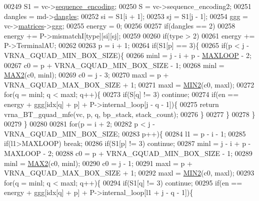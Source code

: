 \begin{DoxyCode}
00249   S1          = vc->\hyperlink{group__fold__compound_a9934bdb695d35a3544285cbcc19f9763}{sequence\_encoding};
00250   S           = vc->sequence\_encoding2;
00251   dangles     = md->\hyperlink{group__model__details_adcda4ff2ea77748ae0e8700288282efc}{dangles};
00252   si          = S1[i + 1];
00253   sj          = S1[j - 1];
00254   ggg         = vc->\hyperlink{group__fold__compound_aca8be7bdc65bafe2172c6ee777f18568}{matrices}->\hyperlink{group__dp__matrices_a0b7b86a5c75c96eabb89eb53a13e7164}{ggg};
00255   energy      = 0;
00256 
00257   \textcolor{keywordflow}{if}(dangles == 2)
00258     energy += P->mismatchI[type][si][sj];
00259 
00260   \textcolor{keywordflow}{if}(type > 2)
00261     energy += P->TerminalAU;
00262 
00263   p = i + 1;
00264   \textcolor{keywordflow}{if}(S1[p] == 3)\{
00265     \textcolor{keywordflow}{if}(p < j - VRNA\_GQUAD\_MIN\_BOX\_SIZE)\{
00266       minl  = j - i + p - \hyperlink{energy__const_8h_ad1bd6eabac419670ddd3c9ed82145988}{MAXLOOP} - 2;
00267       c0    = p + VRNA\_GQUAD\_MIN\_BOX\_SIZE - 1;
00268       minl  = \hyperlink{group__utils_gadd91367918fadbc8d585940d6206d6d2}{MAX2}(c0, minl);
00269       c0    = j - 3;
00270       maxl  = p + VRNA\_GQUAD\_MAX\_BOX\_SIZE + 1;
00271       maxl  = \hyperlink{group__utils_ga2dd4a927a7f937f43a90c144d79107d8}{MIN2}(c0, maxl);
00272       \textcolor{keywordflow}{for}(q = minl; q < maxl; q++)\{
00273         \textcolor{keywordflow}{if}(S[q] != 3) \textcolor{keywordflow}{continue};
00274         \textcolor{keywordflow}{if}(en == energy + ggg[idx[q] + p] + P->internal\_loop[j - q - 1])\{
00275           \textcolor{keywordflow}{return} vrna\_BT\_gquad\_mfe(vc, p, q, bp\_stack, stack\_count);
00276         \}
00277       \}
00278     \}
00279   \}
00280 
00281   \textcolor{keywordflow}{for}(p = i + 2;
00282       p < j - VRNA\_GQUAD\_MIN\_BOX\_SIZE;
00283       p++)\{
00284     l1    = p - i - 1;
00285     \textcolor{keywordflow}{if}(l1>MAXLOOP) \textcolor{keywordflow}{break};
00286     \textcolor{keywordflow}{if}(S1[p] != 3) \textcolor{keywordflow}{continue};
00287     minl  = j - i + p - MAXLOOP - 2;
00288     c0    = p + VRNA\_GQUAD\_MIN\_BOX\_SIZE - 1;
00289     minl  = \hyperlink{group__utils_gadd91367918fadbc8d585940d6206d6d2}{MAX2}(c0, minl);
00290     c0    = j - 1;
00291     maxl  = p + VRNA\_GQUAD\_MAX\_BOX\_SIZE + 1;
00292     maxl  = \hyperlink{group__utils_ga2dd4a927a7f937f43a90c144d79107d8}{MIN2}(c0, maxl);
00293     \textcolor{keywordflow}{for}(q = minl; q < maxl; q++)\{
00294       \textcolor{keywordflow}{if}(S1[q] != 3) \textcolor{keywordflow}{continue};
00295       \textcolor{keywordflow}{if}(en == energy + ggg[idx[q] + p] + P->internal\_loop[l1 + j - q - 1])\{

\end{DoxyCode}
